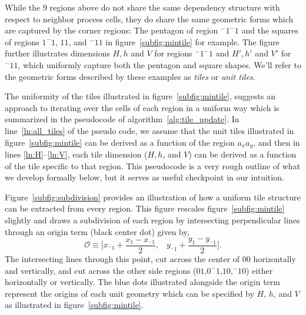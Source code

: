 While the 9 regions above do not share the same dependency structure with respect to neighbor process cells,
they do share the same geometric forms which are captured by the corner regions: The pentagon of region
$^-1^-1$ and the squares of regions $1^-1$, $11$, and
$^-11$ in figure~\ref{subfig:mintile}
for example.
  The figure further illustrates dimensions
$H,h$ and $V$ for regions $^-1^-1$ and $H',h'$ and $V'$
for $^-11$, which uniformly capture both the pentagon
and square shapes.
We'll refer to the geometric forms described by these
examples as {\it tiles} or {\it unit tiles}.

The uniformity of the tiles illustrated in
figure~\ref{subfig:mintile}, suggests an approach
to iterating over the cells of each
region in a uniform way which is
summarized in the pseudocode
of algorithm~\ref{alg:tile_update}.
  In line~\ref{ln:all_tiles} of the pseudo code, we assume that the unit tiles
 illustrated in figure~\ref{subfig:mintile} can be derived as a function of
 the region $a_xa_y$, and then in lines \ref{ln:H}--\ref{ln:V},
  each tile dimension ($H,h$, and $V$) can
 be derived as a function of the tile specific to that region.
 This pseudocode is a very rough outline of
 what we develop formally below, but it serves as
 useful checkpoint in our intuition.

Figure~\ref{subfig:subdivision} provides an illustration of how
a uniform tile structure can be extracted from every region.
This figure rescales figure~\ref{subfig:mintile} slightly and draws
a subdivision of each region
by intersecting perpendicular lines through an origin term (black center dot)
given by,
\begin{equation}
  \mathcal{O} \equiv \bigl[x_{^-1} + \frac{x_1 - x_{^-1}}{2}, \;\;\; y_{^-1} + \frac{y_1 - y_{^-1}}{2} \bigl].
  \label{eq:O}
\end{equation}
The intersecting lines through this point, cut across the center of $00$ horizontally and vertically,
and cut across the other side regions
($01$,$0^-1$,$10$,$^-10$) either horizontally or vertically.
The blue dots illustrated
alongside the origin term represent the
origins of each unit geometry which can be specified by $H$, $h$, and $V$ as illustrated
in figure~\ref{subfig:mintile}.

